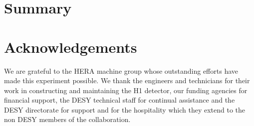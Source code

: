 \documentclass[12pt,a4paper,dvips]{article}
\begin{document}
\section{Summary}
\label{sec:conclusion}

%
\section*{Acknowledgements}
 
%
We are grateful to the HERA machine group whose outstanding
efforts have made this experiment possible.
We thank the engineers and technicians for their work in constructing
and maintaining the H1 detector, our funding agencies for
financial support, the DESY technical staff for continual assistance
and the DESY directorate for support and for the hospitality
which they extend to the non DESY members of the collaboration.


  
\clearpage

%


%
\end{document}
